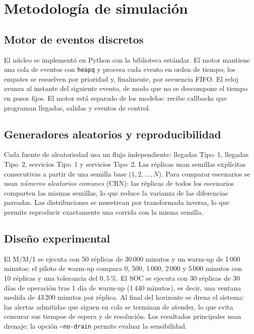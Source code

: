 \section{Metodología de simulación}

\subsection{Motor de eventos discretos}

El núcleo se implementó en Python con la biblioteca estándar. El
motor mantiene una cola de eventos con \texttt{heapq} y procesa cada evento en
orden de tiempo; los empates se resuelven por prioridad y, finalmente, por
secuencia FIFO. El reloj avanza al instante del siguiente evento, de modo que
no se descompone el tiempo en pasos fijos. El motor está separado de los
modelos: recibe callbacks que programan llegadas, salidas y eventos de control.

\subsection{Generadores aleatorios y reproducibilidad}

Cada fuente de aleatoriedad usa un flujo independiente: llegadas Tipo~1,
llegadas Tipo~2, servicios Tipo~1 y servicios Tipo~2. Las réplicas usan
semillas explícitas consecutivas a partir de una semilla base
($1,2,\ldots,N$). Para comparar escenarios se usan \emph{números aleatorios
comunes} (CRN): las réplicas de todos los escenarios comparten las mismas
semillas, lo que reduce la varianza de las diferencias pareadas. Las
distribuciones se muestrean por transformada inversa, lo que permite
reproducir exactamente una corrida con la misma semilla.

\subsection{Diseño experimental}

El M/M/1 se ejecuta con 50 réplicas de 30\,000 minutos y un warm-up de 1\,000
minutos; el piloto de warm-up compara 0, 500, 1\,000, 2\,000 y 5\,000 minutos
con 10 réplicas y una tolerancia del $0{,}5$\,\%. El SOC se ejecuta con 30
réplicas de 30 días de operación tras 1 día de warm-up (1\,440 minutos), es
decir, una ventana medida de 43\,200 minutos por réplica. Al final del
horizonte se drena el sistema: las alertas admitidas que siguen en cola se
terminan de atender, lo que evita censurar sus tiempos de espera y de
resolución. Los resultados principales usan drenaje; la opción \texttt{--no-drain}
permite evaluar la sensibilidad.

